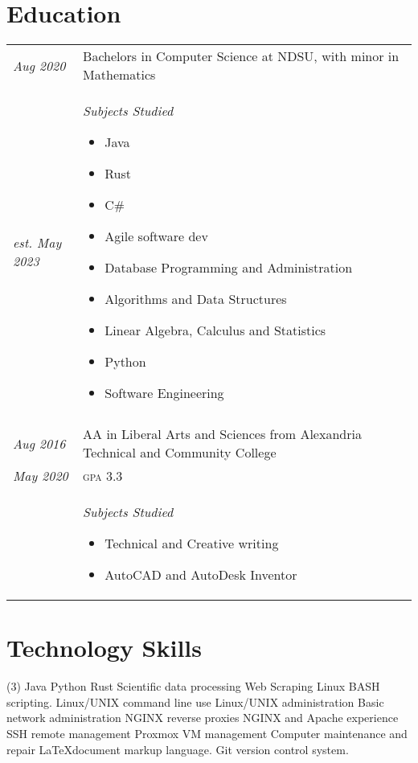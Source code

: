 \documentclass[letterpaper,10pt]{article}
\begin{document}
\section*{Education}
	\begin{tabular}{R{2cm}|p{14cm}}
	\textsl{Aug 2020} & Bachelors in Computer Science at NDSU, with minor in Mathematics\\
	\textsl{est. May 2023} & \textsl{Subjects Studied}
	\begin{itemize}[noitemsep]
		\item Java
		\item Rust
		\item C\#
		\item Agile software dev
		\item Database Programming and Administration
		\item Algorithms and Data Structures
		\item Linear Algebra, Calculus and Statistics
		\item Python
		\item Software Engineering
	\end{itemize}\\
	\\
	\textsl{Aug 2016} & AA in Liberal Arts and Sciences from Alexandria Technical and Community College\\
	\textsl{May 2020} & \textsc{gpa} 3.3\\
	&\textsl{Subjects Studied}
	\begin{itemize}[noitemsep]
		\item Technical and Creative writing
		\item AutoCAD and AutoDesk Inventor
	\end{itemize}
	\end{tabular}
\newpage
\section*{Technology Skills}
	\begin{tasks}[style=itemize](3)
	\task Java
	\task Python
	\task Rust
	\task Scientific data processing
	\task Web Scraping
	\task Linux BASH scripting.
	\task Linux/UNIX command line use
	\task Linux/UNIX administration
	\task Basic network administration
	\task NGINX reverse proxies
	\task NGINX and Apache experience
	\task SSH remote management
	\task Proxmox VM management
	\task Computer maintenance and repair
	\task \LaTeX document markup language.
	\task Git version control system.
	\end{tasks}
\end{document}
